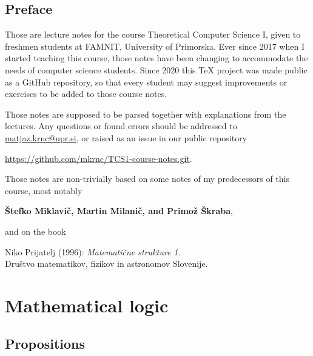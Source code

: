 \documentclass[11pt,paper=b5,footinclude,headinclude]{scrbook} %
\theoremstyle{remark}
\theoremstyle{definition} %
\theoremstyle{theorem} %
\newcommand{\myAuthors}{Štefko Miklavič, Martin Milanič, and Primož Škraba}
\newcommand{\myRepo}{\url{https://github.com/mkrnc/TCS1-course-notes.git}}
\begin{document}


\newpage
\section*{Preface}
    Those are lecture notes for the course Theoretical Computer Science I, given to freshmen students at FAMNIT, University of Primorska.
Ever since 2017 when I started teaching this course, those notes have been changing to accommodate the needs of computer science students.
Since 2020 this TeX project was made public as a GitHub repository, so that every student may suggest improvements or exercises to be added to those course notes. 

Those notes are supposed to be parsed together with explanations from the lectures. 
Any questions or found errors should be 
addressed to \url{matjaz.krnc@upr.si}, or 
raised as an issue in our public repository 
\begin{center}
    \myRepo.    
\end{center}

\medskip
Those notes are non-trivially based on some notes of my predecessors of this course, most notably 
\begin{center}
    \textbf{\myAuthors},
\end{center}
and on the book
\begin{center}
   Niko Prijatelj (1996):
   \emph{Matematične strukture 1}.
   \\
   Društvo   matematikov,   fizikov in astronomov Slovenije. 
\end{center}





\tableofcontents

\chapter{Mathematical logic}
\section{Propositions}
\end{document}
